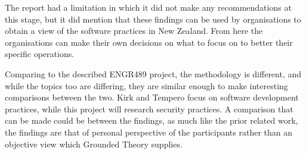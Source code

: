 \par The report had a limitation in which it did not make any recommendations at this stage, but it did mention that these findings can be used by organisations to obtain a view of the software practices in New Zealand. From here the organisations can make their own decisions on what to focus on to better their specific operations.  
\newline
\par Comparing to the described ENGR489 project, the methodology is different, and while the topics too are differing, they are similar enough to make interesting comparisons between the two. Kirk and Tempero focus on software development practices, while this project will research security practices. A comparison that can be made could be between the findings, as much like the prior related work, the findings are that of personal perspective of the participants rather than an objective view which Grounded Theory supplies.

